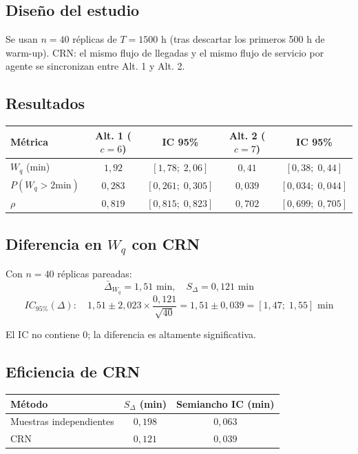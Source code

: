 \documentclass[11pt, letterpaper]{article}
\begin{document}
\subsection{Diseño del estudio}

Se usan $n=40$ réplicas de $T=1500$ h (tras descartar los primeros 500 h de warm-up). CRN: el mismo flujo de llegadas y el mismo flujo de servicio por agente se sincronizan entre Alt. 1 y Alt. 2.

\subsection{Resultados}

\begin{center}\small
\renewcommand{\arraystretch}{1.35}
\begin{tabular}{lcccc}
\toprule
\textbf{Métrica} & \textbf{Alt. 1 ($c=6$)} & \textbf{IC 95\%} & \textbf{Alt. 2 ($c=7$)} & \textbf{IC 95\%} \\
\midrule
$W_q$ (min)        & $1{,}92$ & $[1{,}78;\;2{,}06]$ & $0{,}41$ & $[0{,}38;\;0{,}44]$ \\
$P(W_q>2\text{min})$ & $0{,}283$ & $[0{,}261;\;0{,}305]$ & $0{,}039$ & $[0{,}034;\;0{,}044]$ \\
$\rho$             & $0{,}819$ & $[0{,}815;\;0{,}823]$ & $0{,}702$ & $[0{,}699;\;0{,}705]$ \\
\bottomrule
\end{tabular}
\end{center}

\subsection{Diferencia en $W_q$ con CRN}

Con $n=40$ réplicas pareadas:
\[
\bar\Delta_{W_q} = 1{,}51 \text{ min}, \quad S_\Delta = 0{,}121 \text{ min}
\]
\[
IC_{95\%}(\Delta): \quad 1{,}51 \pm 2{,}023 \times \frac{0{,}121}{\sqrt{40}} = 1{,}51 \pm 0{,}039 = [1{,}47;\; 1{,}55] \text{ min}
\]

El IC no contiene 0; la diferencia es altamente significativa.

\subsection{Eficiencia de CRN}

\begin{center}\small
\renewcommand{\arraystretch}{1.25}
\begin{tabular}{lcc}
\toprule
\textbf{Método} & $S_\Delta$ (min) & Semiancho IC (min) \\
\midrule
Muestras independientes & $0{,}198$ & $0{,}063$ \\
CRN                     & $0{,}121$ & $0{,}039$ \\
\bottomrule
\end{tabular}
\end{center}
\end{document}
